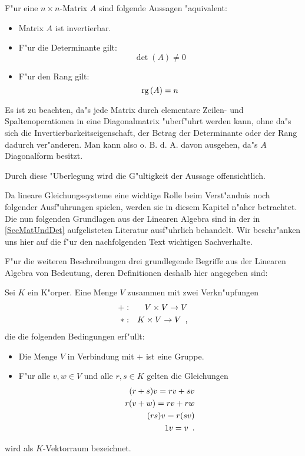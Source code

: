 \begin{satz}
\label{SatzRgDetInv}
    F"ur eine $n \times n$-Matrix $A$ sind folgende Aussagen "aquivalent:
    \begin{itemize}
    \item
         Matrix $A$ ist invertierbar.
    \item
         F"ur die Determinante gilt:
         \[ \det(A) \neq 0 \]
    \item
         F"ur den Rang gilt:
         \[ \mbox{\rm rg} \,(A) = n \]
    \end{itemize}
\end{satz}
\begin{beweis}
    Es ist zu beachten, da"s jede Matrix durch elementare Zeilen-
    und Spaltenoperationen in eine Diagonalmatrix "uberf"uhrt werden kann,
    ohne da"s sich die Invertierbarkeitseigenschaft, der Betrag der 
    Determinante oder der Rang dadurch ver"anderen. Man kann also 
    o. B. d. A. davon ausgehen, da"s $A$ Diagonalform besitzt.
    
    Durch diese "Uberlegung wird die G"ultigkeit der Aussage offensichtlich.
\end{beweis}


\label{SecLinEqu}

Da lineare Gleichungssysteme eine wichtige Rolle beim Verst"andnis
noch folgender Ausf"uhrungen spielen, werden sie in diesem Kapitel
n"aher betrachtet. Die nun folgenden Grundlagen aus der Linearen 
Algebra sind in der in \ref{SecMatUndDet} aufgelisteten Literatur
ausf"uhrlich behandelt. Wir beschr"anken uns hier auf die f"ur
den nachfolgenden Text wichtigen Sachverhalte.

F"ur die weiteren Beschreibungen drei grundlegende Begriffe aus der 
Linearen Algebra von Bedeutung, deren Definitionen deshalb hier
angegeben sind:

Sei $K$ ein K"orper. Eine Menge $V$ zusammen mit zwei Verkn"upfungen
\begin{eqnarray}
    + & : & V \times V \rightarrow V \\
    * & : & K \times V \rightarrow V \mbox{\hspace{0.5em},}
\end{eqnarray}
die die folgenden Bedingungen erf"ullt:
\begin{itemize}
\item Die Menge $V$ in Verbindung mit $+$ ist eine Gruppe.
\item F"ur alle $v,w \in V$ und alle $r,s \in K$ gelten die 
      Gleichungen
      \begin{eqnarray*}
          (r+s)v = rv +sv \\
          r(v+w) = rv + rw \\
          (rs)v = r(sv) \\
          1v = v \mbox{\hspace{0.5em}.} 
      \end{eqnarray*}
\end{itemize}
wird als $K$-Vektorraum bezeichnet.

